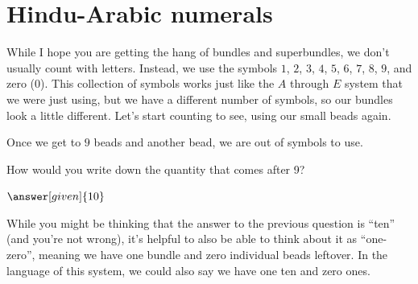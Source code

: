 \documentclass{ximera}
\begin{document}
\section{Hindu-Arabic numerals}

While I hope you are getting the hang of bundles and superbundles, we don't usually count with letters. Instead, we use the symbols $1$, $2$, $3$, $4$, $5$, $6$, $7$, $8$, $9$, and zero ($0$). This collection of symbols works just like the $A$ through $E$ system that we were just using, but we have a different number of symbols, so our bundles look a little different. Let's start counting to see, using our small beads again.

\begin{image}
\end{image}

Once we get to $9$ beads and another bead, we are out of symbols to use.

\begin{image}
\end{image}

\begin{question}
How would you write down the quantity that comes after 9?

\begin{prompt}
	$\answer[given]{10}$
\end{prompt}
\end{question}

While you might be thinking that the answer to the previous question is ``ten'' (and you're not wrong), it's helpful to also be able to think about it as ``one-zero'', meaning we have one bundle and zero individual beads leftover. In the language of this system, we could also say we have one ten and zero ones.
\end{document}
